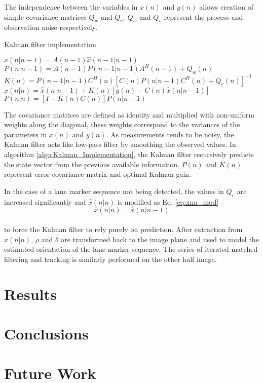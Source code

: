 \documentclass{article}
\begin{document}
The independence between the variables in $x(n)$ and $y(n)$ allows creation of simple covariance matrices $Q_w$ and $Q_v$. $Q_w$ and $Q_v$ represent the process and observation noise respectively. 
\begin{algorithm}[htb]
\caption{Kalman filter implementation}
\label{algo:Kalman_Implementation}
\begin{algorithmic}[1]
\STATE $\hat{x}(n|n-1)=A(n-1)\hat{x}(n-1|n-1)$
\STATE $P(n|n-1)=A(n-1)P(n-1|n-1)A^H(n-1)+Q_w(n)$
\STATE $K(n)=P(n-1|n-1)C^H(n)[C(n)P(n|n-1)C^H(n)+Q_v(n)]^{-1}$
\STATE $\hat{x}(n|n)=\hat{x}(n|n-1)+K(n)[y(n)-C(n)\hat{x}(n|n-1)]$
\STATE $P(n|n)=[I-K(n)C(n)]P(n|n-1)$
\ENDFOR
\end{algorithmic}
\end{algorithm}
The covariance matrices are defined as identity and multiplied with non-uniform weights along the diagonal, these weights correspond to the variances of the parameters in $x(n)$ and $y(n)$. As measurements tends to be noisy, the Kalman filter acts like low-pass filter by smoothing the observed values. In algorithm \ref{algo:Kalman_Implementation}, the Kalman filter recursively predicts the state vector from the previous available information. $P(n)$ and $K(n)$ represent error covariance matrix and optimal Kalman gain.

In the case of a lane marker sequence not being detected, the values in $Q_v$ are increased significantly and $\hat{x}(n|n)$ is modified as Eq. \ref{eq:xnn_mod} 
\begin{equation}
\hat{x}(n|n) = \hat{x}(n|n-1)
\label{eq:xnn_mod}
\end{equation}\\
to force the Kalman filter to rely purely on prediction. After extraction from $\hat{x}(n|n)$, $\rho$ and $\theta$ are transformed back to the image plane and used to model the estimated orientation of the lane marker sequence. The series of iterated matched filtering and tracking is similarly performed on the other half image.

\section{Results}
\label{sec:results}

\section{Conclusions}
\label{sec:concl}


\section{Future Work}
\label{sec:print}




\end{document}
